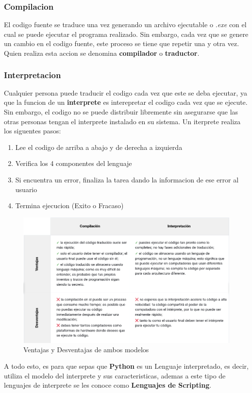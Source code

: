 \documentclass{article}
\begin{document}
\subsubsection{Compilacion}
El codigo fuente se traduce una vez generando un archivo ejecutable o \textit{.exe} con el cual se puede ejecutar el programa realizado. Sin embargo, cada vez que se genere un cambio en el codigo fuente, este proceso se tiene que repetir una y otra vez. Quien realiza esta accion se denomina \textbf{compilador} o \textbf{traductor}. 
\subsubsection{Interpretacion}
Cualquier persona puede traducir el codigo cada vez que este se deba ejecutar, ya que la funcion de un \textbf{interprete} es interepretar el codigo cada vez que se ejecute. Sin embargo, el codigo no se puede distribuir libremente sin asegurarse que las otras personas tengan el interprete instalado en su sistema. Un iterprete realiza los siguentes pasos:
\begin{enumerate}
    \item Lee el codigo de arriba a abajo y de derecha a izquierda
    \item Verifica los 4 componentes del lenguaje
    \item Si encuentra un error, finaliza la tarea dando la informacion de ese error al usuario
    \item Termina ejecucion (Exito o Fracaso)
\end{enumerate}
\begin{figure}[H]
    \centering
    \includegraphics[width=0.75\linewidth]{CompiladorvsInterprete.png}
    \caption{Ventajas y Desventajas de ambos modelos}
    \label{fig:enter-label}
\end{figure}
A todo esto, es para que sepas que \textbf{Python} es un Lenguaje interpretado, es decir, utiliza el modelo del interprete y sus caracteristicas, ademas a este tipo de lenguajes de interprete se les conoce como \textbf{Lenguajes de Scripting}.
\end{document}
